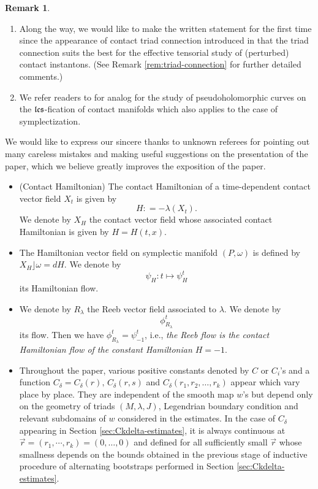 \documentclass[reqno]{amsart}
\theoremstyle{theorem}
\theoremstyle{definition}
\newtheorem{rem}[thm]{Remark}
\numberwithin{equation}{section}
\begin{document}
\begin{rem} \begin{enumerate}
\item
Along the way, we would like to make the written statement
for the first time since the appearance of contact triad connection introduced in
 \cite{oh-wang:connection} that the triad connection  suits the best for the effective tensorial study
of (perturbed) contact instantons.
(See Remark \ref{rem:triad-connection} for further detailed comments.)
\item
We refer readers to \cite{oh-savelyev} for analog for the study of
pseudoholomorphic curves on the $\frak{lcs}$-fication of contact manifolds which also applies to the case of symplectization.
\end{enumerate}
\end{rem}

\bigskip

 We would like to express our sincere thanks
to unknown referees for pointing out many careless mistakes and making useful suggestions
on the presentation of the paper, which we believe greatly improves
the exposition of the paper.


\bigskip


\medskip

\begin{itemize}
\item {(Contact Hamiltonian)} The contact Hamiltonian of a time-dependent contact vector field $X_t$ is
given by
$$
H: = - \lambda(X_t).
$$
We denote by $X_H$ the contact vector field whose associated contact Hamiltonian is given by $H = H(t,x)$.
\item The Hamiltonian vector field on symplectic manifold $(P, \omega)$ is defined by $X_H \rfloor \omega = dH$.
We denote by
$$
\psi_H: t\mapsto \psi_H^t
$$
its Hamiltonian flow.
\item We denote by $R_\lambda$ the Reeb vector field associated to $\lambda$. We denote by
$$
\phi_{R_\lambda}^t
$$
its flow. Then we have $\phi_{R_\lambda}^t  = \psi_{-1}^t$, i.e., \emph{the Reeb flow is the contact Hamiltonian
flow of the constant Hamiltonian $H = -1$}.
\item Throughout the paper,  various positive constants denoted by
 $C$ or  $C_i$'s and a function $C_\delta = C_\delta(r), \, C_\delta(r,s)$ and
 $C_\delta(r_1, r_2, \ldots, r_k)$  appear which vary place by place.
 They are independent of the smooth map $w$'s
  but depend only on the geometry of triads $(M,\lambda, J)$, Legendrian boundary condition
  and relevant subdomains of $w$ considered in the estimates. In the case of $C_\delta$
  appearing in Section \ref{sec:Ckdelta-estimates},  it is always continuous at
  $\vec r = (r_1, \cdots, r_k) = (0, \ldots, 0)$ and defined for all sufficiently small
$\vec r$ whose smallness depends on the bounds  obtained in the previous stage
of inductive procedure of alternating bootstraps performed in Section \ref{sec:Ckdelta-estimates}.
\end{itemize}
\end{document}
